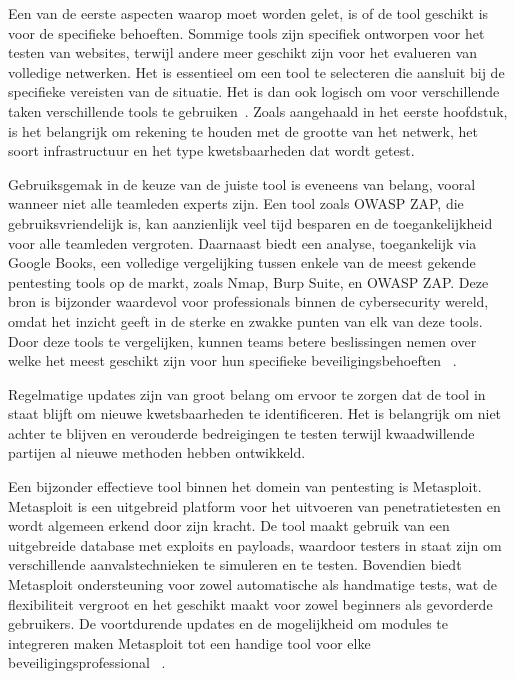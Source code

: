 Een van de eerste aspecten waarop moet worden gelet, is of de tool geschikt is voor de specifieke behoeften. Sommige tools 
zijn specifiek ontworpen voor het testen van websites, terwijl andere meer geschikt zijn voor het evalueren van volledige 
netwerken. Het is essentieel om een tool te selecteren die aansluit bij de specifieke vereisten van de situatie. Het 
is dan ook logisch om voor verschillende taken verschillende tools te gebruiken~\autocite{Deepikakongara2023}.
Zoals aangehaald in het eerste hoofdstuk, is het belangrijk om rekening te houden met de grootte van het netwerk, 
het soort infrastructuur en het type kwetsbaarheden dat wordt getest.

Gebruiksgemak in de keuze van de juiste tool is eveneens van belang, vooral wanneer niet alle teamleden experts zijn. Een tool zoals OWASP ZAP, 
die gebruiksvriendelijk is, kan aanzienlijk veel tijd besparen en de toegankelijkheid voor alle teamleden vergroten.
Daarnaast biedt een analyse, toegankelijk via Google Books, een volledige vergelijking tussen enkele van de meest gekende pentesting tools op de markt, 
zoals Nmap, Burp Suite, en OWASP ZAP. Deze bron is bijzonder waardevol voor professionals binnen de cybersecurity wereld, omdat het inzicht geeft in de sterke en zwakke 
punten van elk van deze tools. Door deze tools te vergelijken, kunnen teams betere beslissingen nemen over welke het meest geschikt zijn 
voor hun specifieke beveiligingsbehoeften ~\autocite{Velu2022}.

Regelmatige updates zijn van groot belang om ervoor te zorgen dat de tool in staat blijft om nieuwe kwetsbaarheden te 
identificeren. Het is belangrijk om niet achter te blijven en verouderde bedreigingen te testen terwijl kwaadwillende 
partijen al nieuwe methoden hebben ontwikkeld.

Een bijzonder effectieve tool binnen het domein van pentesting is Metasploit. Metasploit is een uitgebreid platform voor het uitvoeren van 
penetratietesten en wordt algemeen erkend door zijn kracht. De tool maakt gebruik van een uitgebreide database met exploits en 
payloads, waardoor testers in staat zijn om verschillende aanvalstechnieken te simuleren en te testen. Bovendien biedt Metasploit ondersteuning 
voor zowel automatische als handmatige tests, wat de flexibiliteit vergroot en het geschikt maakt voor zowel beginners als gevorderde gebruikers. 
De voortdurende updates en de mogelijkheid om modules te integreren maken Metasploit tot een handige tool voor elke 
beveiligingsprofessional ~\autocite{Rani2019}. 


